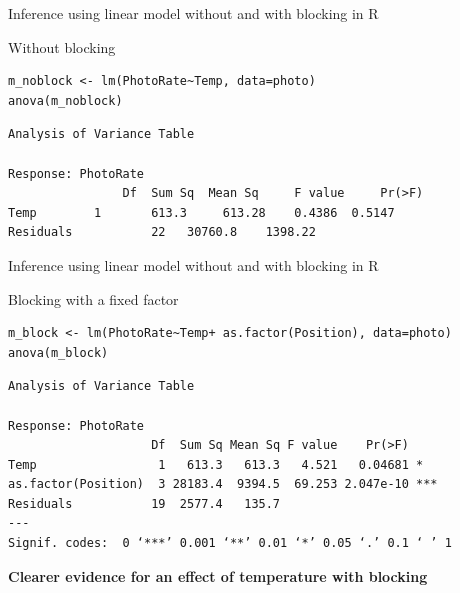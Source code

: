 \documentclass{beamer}
\makeatletter
\newenvironment{kframe}{%
 \def\at@end@of@kframe{}%
 \ifinner\ifhmode%
  \def\at@end@of@kframe{\end{minipage}}%
  \begin{minipage}{\columnwidth}%
 \fi\fi%
 \def\FrameCommand##1{\hskip\@totalleftmargin \hskip-\fboxsep
 \colorbox{shadecolor}{##1}\hskip-\fboxsep
     \hskip-\linewidth \hskip-\@totalleftmargin \hskip\columnwidth}%
 \MakeFramed {\advance\hsize-\width
   \@totalleftmargin\z@ \linewidth\hsize
   \@setminipage}}%
 {\par\unskip\endMakeFramed%
 \at@end@of@kframe}
\newenvironment{knitrout}{}{} %
\makeatother
\begin{document}
\begin{frame}[fragile]{Inference using linear model without and with blocking in R}
 
 Without blocking
  \begin{knitrout}
\color{fgcolor}\begin{kframe}
\begin{verbatim}
m_noblock <- lm(PhotoRate~Temp, data=photo)
anova(m_noblock)
\end{verbatim}
\end{kframe}
\end{knitrout}

\begin{knitrout}
\color{fgcolor}\begin{kframe}
\begin{verbatim}
Analysis of Variance Table
 
Response: PhotoRate
          		Df  Sum Sq 	Mean Sq 	F value 	Pr(>F)
Temp      	1       613.3  	  613.28  	0.4386 	0.5147
Residuals           22   30760.8 	1398.22
\end{verbatim}
\end{kframe}
\end{knitrout}
 
\end{frame}


\begin{frame}[fragile]{Inference using linear model without and with blocking in R}
 
 Blocking with a fixed factor
  \begin{knitrout}
\color{fgcolor}\begin{kframe}
\begin{verbatim}
m_block <- lm(PhotoRate~Temp+ as.factor(Position), data=photo)
anova(m_block)
\end{verbatim}
\end{kframe}
\end{knitrout}

\begin{knitrout}
\color{fgcolor}\begin{kframe}
\begin{verbatim}
Analysis of Variance Table

Response: PhotoRate
                    Df  Sum Sq Mean Sq F value    Pr(>F)    
Temp                 1   613.3   613.3   4.521   0.04681 *  
as.factor(Position)  3 28183.4  9394.5  69.253 2.047e-10 ***
Residuals           19  2577.4   135.7                      
---
Signif. codes:  0 ‘***’ 0.001 ‘**’ 0.01 ‘*’ 0.05 ‘.’ 0.1 ‘ ’ 1
\end{verbatim}
\end{kframe}
\end{knitrout}
 
 \textbf{Clearer evidence for an effect of temperature with blocking}
 
\end{frame}
\end{document}
